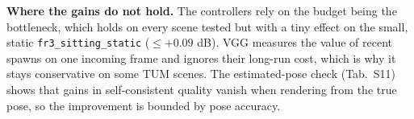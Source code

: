 \textbf{Where the gains do not hold.} The controllers rely on the budget being the bottleneck, which holds on every scene tested but with a tiny effect on the small, static \texttt{fr3\_sitting\_static} ($\le +0.09$ dB). VGG measures the value of recent spawns on one incoming frame and ignores their long-run cost, which is why it stays conservative on some TUM scenes. The estimated-pose check (Tab.~S11) shows that gains in self-consistent quality vanish when rendering from the true pose, so the improvement is bounded by pose accuracy.

